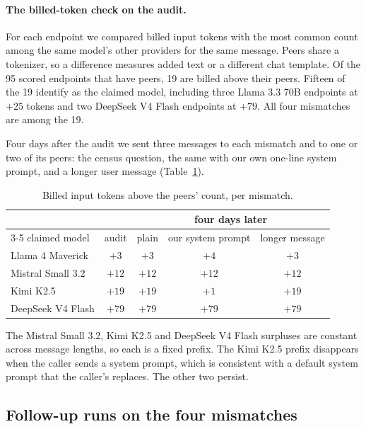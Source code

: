 \documentclass[11pt]{article}
\begin{document}
\paragraph{The billed-token check on the audit.} For each endpoint we compared billed input tokens
with the most common count among the same model's other providers for the same message. Peers
share a tokenizer, so a difference measures added text or a different chat template. Of the 95
scored endpoints that have peers, 19 are billed above their peers. Fifteen of the 19 identify as
the claimed model, including three Llama 3.3 70B endpoints at $+25$ tokens and two DeepSeek V4
Flash endpoints at $+79$. All four mismatches are among the 19.

Four days after the audit we sent three messages to each mismatch and to one or two of its peers:
the census question, the same with our own one-line system prompt, and a longer user message
(Table~\ref{tab:surplus}).

\begin{table}[h]
\centering\small
\begin{tabular}{lcccc}
\toprule
& & \multicolumn{3}{c}{four days later} \\
\cmidrule(lr){3-5}
claimed model & audit & plain & our system prompt & longer message \\
\midrule
Llama 4 Maverick & $+3$ & $+3$ & $+4$ & $+3$ \\
Mistral Small 3.2 & $+12$ & $+12$ & $+12$ & $+12$ \\
Kimi K2.5 & $+19$ & $+19$ & $+1$ & $+19$ \\
DeepSeek V4 Flash & $+79$ & $+79$ & $+79$ & $+79$ \\
\bottomrule
\end{tabular}
\caption{Billed input tokens above the peers' count, per mismatch.}
\label{tab:surplus}
\end{table}

The Mistral Small 3.2, Kimi K2.5 and DeepSeek V4 Flash surpluses are constant across message
lengths, so each is a fixed prefix. The Kimi K2.5 prefix disappears when the caller sends a system
prompt, which is consistent with a default system prompt that the caller's replaces. The other two
persist. 

\subsection{Follow-up runs on the four mismatches}
\label{sec:followup}
\end{document}

